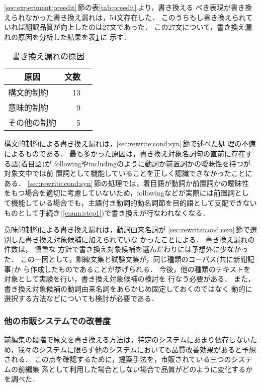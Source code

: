 \ref{sec:experiment:preedit}\,節の表\ref{tab:preedit}\,より，書き換える
べき表現が書き換えられなかった書き換え漏れは，54文存在した．
このうちもし書き換えられていれば翻訳品質が向上したのは27文であった．
この27文について，書き換え漏れの原因を分析した結果を表\ref{tab:leak}\,に
示す．
\begin{table}[htbp]
\caption{書き換え漏れの原因}
\label{tab:leak}
\begin{center}
\begin{tabular}{|l|r|r|} \hline
\multicolumn{1}{|c}{原因}&
\multicolumn{1}{|c|}{文数}\\\hline\hline
構文的制約   & 13 \\
意味的制約   &  9 \\
その他の制約 &  5 \\\hline
\end{tabular}
\end{center}
\end{table}

構文的制約による書き換え漏れは，\ref{sec:rewrite:cond:syn}\,節で述べた処
理の不備によるものである．
最も多かった原因は，書き換え対象名詞句の直前に存在する語(着目語)が
followingやincludingのように動詞か前置詞かの曖昧性を持つが対象文中では前 
置詞として機能していることを正しく認識できなかったことにある．
\ref{sec:rewrite:cond:syn}\,節の処理では，着目語が動詞か前置詞かの曖昧性
をもつ場合を適切に考慮していないため，followingなどが実際には前置詞とし
て機能している場合でも，主語付き動詞的動名詞節を目的語として支配できない
ものとして手続き(\ref{enum:step1})で書き換えが行なわれなくなる．

意味的制約による書き換え漏れは，動詞由来名詞が
\ref{sec:rewrite:cond:sem}\,節で選別した書き換え対象候補に加えられていな
かったことによる．
書き換え漏れの件数は，
慎重な
方針で書き換え対象候補を選んだわりには予想外に少なかった． 
この一因として，訓練文集と試験文集が，同じ種類のコーパス(共に新聞記事)か
ら作成したものであることが挙げられる．
今後，他の種類のテキストを対象として実験を行い，書き換え対象候補の検討を
行なう必要がある．
また，書き換え対象候補の動詞由来名詞をあらかじめ固定しておくのではなく
動的に選択する方法などについても検討が必要である．

\subsubsection{他の市販システムでの改善度}
\label{sec:experiment:trans:others}

前編集の段階で原文を書き換える方法は，特定のシステムにあまり依存しないた
め，我々のシステムに限らず他のシステムにおいても品質改善効果があると予想
される．
この点を確認するために，提案手法を，市販されている三つのシステムの前編集
系として利用した場合としない場合で品質がどのように変化するかを調べた．

